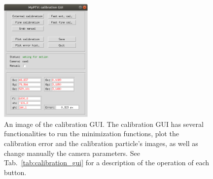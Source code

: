 \documentclass[10pt,a4paper]{article}
\begin{document}
\begin{figure}
	\centering
	\includegraphics[width=0.4\textwidth]{calibration_gui.png}
	\caption{An image of the calibration GUI. The calibration GUI has several functionalities to run the minimization functions, plot the calibration error and the calibration particle's images, as well as change manually the camera parameters. See Tab.~\ref{tab:calibration_gui} for a description of the operation of each button. \label{fig:calibration_gui}}
\end{figure}
\end{document}
